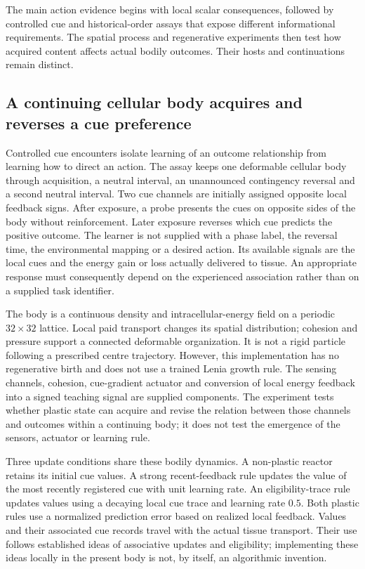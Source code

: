 The main action evidence begins with local scalar consequences, followed by controlled cue and historical-order assays that expose different informational requirements. The spatial process and regenerative experiments then test how acquired content affects actual bodily outcomes. Their hosts and continuations remain distinct.



\subsection*{A continuing cellular body acquires and reverses a cue preference}

Controlled cue encounters isolate learning of an outcome relationship from learning how to direct an action. The assay keeps one deformable cellular body through acquisition, a neutral interval, an unannounced contingency reversal and a second neutral interval. Two cue channels are initially assigned opposite local feedback signs. After exposure, a probe presents the cues on opposite sides of the body without reinforcement. Later exposure reverses which cue predicts the positive outcome. The learner is not supplied with a phase label, the reversal time, the environmental mapping or a desired action. Its available signals are the local cues and the energy gain or loss actually delivered to tissue. An appropriate response must consequently depend on the experienced association rather than on a supplied task identifier.

The body is a continuous density and intracellular-energy field on a periodic $32\times32$ lattice. Local paid transport changes its spatial distribution; cohesion and pressure support a connected deformable organization. It is not a rigid particle following a prescribed centre trajectory. However, this implementation has no regenerative birth and does not use a trained Lenia growth rule. The sensing channels, cohesion, cue-gradient actuator and conversion of local energy feedback into a signed teaching signal are supplied components. The experiment tests whether plastic state can acquire and revise the relation between those channels and outcomes within a continuing body; it does not test the emergence of the sensors, actuator or learning rule.

Three update conditions share these bodily dynamics. A non-plastic reactor retains its initial cue values. A strong recent-feedback rule updates the value of the most recently registered cue with unit learning rate. An eligibility-trace rule updates values using a decaying local cue trace and learning rate $0.5$. Both plastic rules use a normalized prediction error based on realized local feedback. Values and their associated cue records travel with the actual tissue transport. Their use follows established ideas of associative updates and eligibility\cite{sutton,florian,izhikevich,fremaux}; implementing these ideas locally in the present body is not, by itself, an algorithmic invention.

